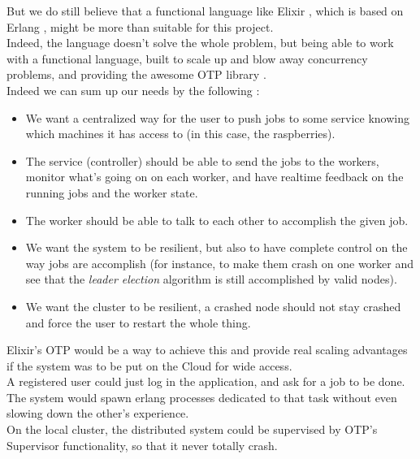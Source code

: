 \documentclass{article}
\begin{document}
    But we do still believe that a functional language like Elixir \cite{elixir}, which
    is based on Erlang \cite{erlang}, might be more than suitable for this project.\\
    Indeed, the language doesn't solve the whole problem, but being able to
    work with a functional language, built to scale up and blow away concurrency
    problems, and providing the awesome OTP library \cite{otp}.\\

    Indeed we can sum up our needs by the following : \\
    \begin{itemize}
      \item We want a centralized way for the user to push jobs to some service
      knowing which machines it has access to (in this case, the raspberries).
      \item The service (controller) should be able to send the jobs to the workers,
      monitor what's going on on each worker, and have realtime feedback on the
      running jobs and the worker state.
      \item The worker should be able to talk to each other to accomplish the
      given job.
      \item We want the system to be resilient, but also to have complete
      control on the way jobs are accomplish (for instance, to make them
      crash on one worker and see that the \textit{leader election} algorithm
      is still accomplished by valid nodes).
      \item We want the cluster to be resilient, a crashed node should not stay crashed
      and force the user to restart the whole thing.
    \end{itemize}

    Elixir's OTP would be a way to achieve this and provide real scaling advantages
    if the system was to be put on the Cloud for wide access.\\
    A registered user could just log in the application, and ask for a job to be
    done. The system would spawn erlang processes dedicated to that task without
    even slowing down the other's experience.\\

    On the local cluster, the distributed system could be supervised by
    OTP's Supervisor \cite{elixirsupervisor} functionality, so that it never
    totally crash.\\


\nocite{*}


\end{document}
